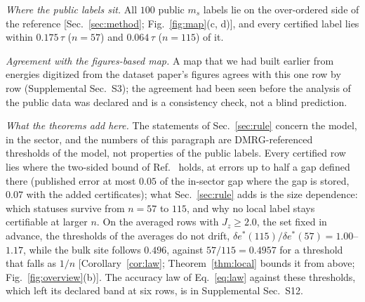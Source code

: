 \documentclass[aps,prx,twocolumn,10pt,superscriptaddress,nofootinbib,longbibliography,floatfix]{revtex4-2}
\theoremstyle{remark}
\newcommand{\Jz}{J_z}
\newcommand{\ms}{m_s}
\newcommand{\des}{\delta e^{*}}
\begin{document}
\emph{Where the public labels sit.} All $100$ public $\ms$ labels lie on the over-ordered side of the reference %
[Sec.~\ref{sec:method}; Fig.~\ref{fig:map}(c, d)], and
every certified label lies within $0.175\,\tau$ ($n=57$) and $0.064\,\tau$ ($n=115$) of it. %

\emph{Agreement with the figures-based map.} A map that we had built earlier from energies digitized from the
dataset paper's figures agrees with this one row by row (Supplemental Sec.~S3); the agreement had been seen before
the analysis of the public data was declared and is a consistency check, not a blind prediction.

\emph{What the theorems add here.} The statements of Sec.~\ref{sec:rule} concern the model, in the sector, and the
numbers of this paragraph are DMRG-referenced thresholds of the model, not properties of the public labels. Every
certified row lies where the two-sided bound of Ref.~\cite{manchanda2026} holds, at errors up to half a gap
defined there (published error at most $0.05$ of the %
in-sector gap where the gap is stored, $0.07$ with the added certificates); what Sec.~\ref{sec:rule} adds is the %
size dependence: which statuses
survive from $n=57$ to $115$, and why no local label stays certifiable at larger $n$. On the averaged rows with
$\Jz\ge2.0$, the set fixed in advance, the thresholds of the averages do not drift,
$\des(115)/\des(57)=1.00$--$1.17$, while the bulk site follows $0.496$, against $57/115=0.4957$ for a threshold %
that falls as $1/n$ [Corollary~\ref{cor:law}; Theorem~\ref{thm:local} bounds it from above; Fig.~\ref{fig:overview}(b)].
The accuracy law of Eq.~\eqref{eq:law} against these thresholds, which left its declared band at six rows, is in Supplemental Sec.~S12. 
\end{document}
